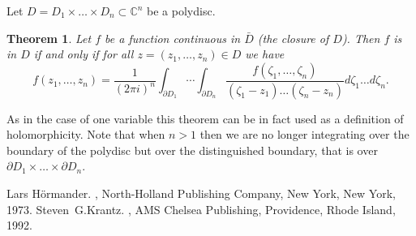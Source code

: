 \documentclass[12pt]{article}
\theoremstyle{theorem}
\newtheorem*{thm}{Theorem}
\theoremstyle{definition}
\theoremstyle{remark}
\begin{document}
Let $D = D_1 \times \ldots \times D_n \subset {\mathbb{C}}^n$ be a polydisc.

\begin{thm}
Let $f$ be a function continuous in $\bar{D}$ (the closure of $D$).  Then
$f$ is
 in $D$
if and only if
for all $z = (z_1,\ldots,z_n) \in D$ we have
\begin{equation*}
f(z_1,\ldots,z_n)
=
\frac{1}{{(2 \pi i)}^n}
\int_{\partial D_1}
\cdots
\int_{\partial D_n}
\frac{f(\zeta_1,\ldots,\zeta_n)}
{(\zeta_1 - z_1)
\ldots
(\zeta_n - z_n)}
d\zeta_1 \ldots d\zeta_n .
\end{equation*}
\end{thm}

As in the case of one variable this theorem can be in fact used as a
definition of holomorphicity.  Note that when $n > 1$ then we are no longer
integrating over the  boundary of the polydisc but over the
distinguished boundary, that is over $\partial D_1 \times \ldots \times
\partial D_n$.

\begin{thebibliography}{9}
Lars H\"ormander.
{\em {}},
North-Holland Publishing Company, New York, New York, 1973.
Steven~G.\@ Krantz.
{\em {}},
AMS Chelsea Publishing, Providence, Rhode Island, 1992.
\end{thebibliography}
\end{document}

